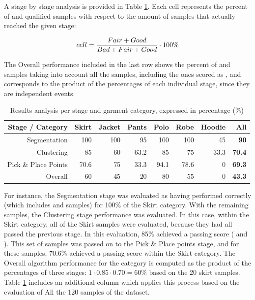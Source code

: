 A stage by stage analysis is provided in Table \ref{table:table2}. Each cell represents the percent of \good{} and \great{} qualified samples with respect to the amount of samples that actually reached the given stage:

\begin{equation}
cell = \frac{Fair + Good}{Bad + Fair + Good} \cdot 100 \%
\end{equation}

The Overall performance included in the last row shows the percent of \good{} and \great{} samples taking into account all the samples, including the ones scored as \discarded{}, and corresponds to the product of the percentages of each individual stage, since they are independent events.

\begin{table}[htbp]
\centering
\begin{tabular}{|r||r|r|r|r|r|r||r|}
\hline
	Stage \slash{} Category & Skirt & Jacket & Pants & Polo & Robe & Hoodie & All \\
\hline\hline
   Segmentation         & 100   & 100 &  95   & 100   & 100   & 45   & \textbf{90}\\
   Clustering           &  85   &  60 &  63.2 &  85   &  75   & 33.3 & \textbf{70.4}\\
   Pick \& Place Points &  70.6 &  75 &  33.3 &  94.1 &  78.6 &  0   & \textbf{69.3}\\
   \hline\hline
   Overall              &  60   &  45 &  20   &  80   &    55 &  0   & \textbf{43.3} \\ 
\hline
\end{tabular}
\caption{Results analysis per stage and garment category, expressed in percentage (\%)}
\label{table:table2}
\end{table}

For instance, the Segmentation stage was evaluated as having performed correctly (which includes \good{} and \great{} samples) for 100\% of the Skirt category. With the remaining samples, the Clustering stage performance was evaluated. In this case, within the Skirt category, all of the Skirt samples were evaluated, because they had all passed the previous stage. In this evaluation, 85\% achieved a passing score (\good{} and \great{}). This set of samples was passed on to the Pick \& Place points stage, and for these samples, 70.6\% achieved a passing score within the Skirt category. The Overall algorithm performance for the category is computed as the product of the percentages of three stages: $1 \cdot 0.85 \cdot 0.70 = 60\%$ based on the 20 skirt samples. Table \ref{table:table2} includes an additional column which applies this process based on the evaluation of All the 120 samples of the dataset.

